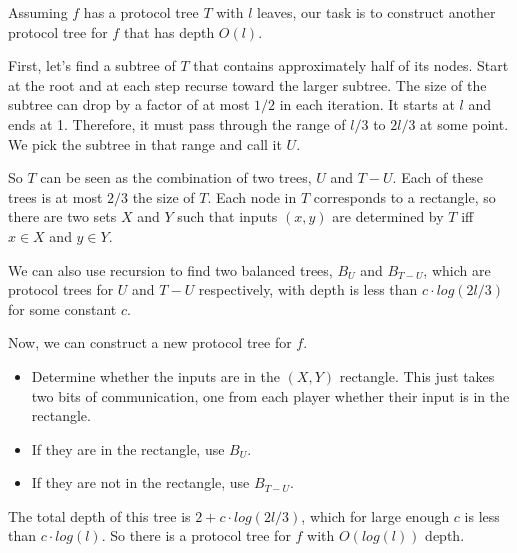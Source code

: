 \documentclass{article}
\newenvironment{problem}[2][Problem]{\begin{trivlist}
\item[\hskip \labelsep {\bfseries #1}\hskip \labelsep {\bfseries #2.}]}{\end{trivlist}}
\begin{document}
\begin{problem}{3}
  Assuming $f$ has a protocol tree $T$ with $l$ leaves, our task is to
  construct another protocol tree for $f$ that has depth $O(l)$.

  First, let's find a subtree of $T$ that contains approximately half
  of its nodes. Start at the root and at each step recurse toward the
  larger subtree. The size of the subtree can drop by a factor of at
  most $1/2$ in each iteration. It starts at $l$ and ends at
  1. Therefore, it must pass through the range of $l/3$ to $2l/3$ at
  some point. We pick the subtree in that range and call it $U$.

  So $T$ can be seen as the combination of two trees, $U$ and
  $T - U$. Each of these trees is at most $2/3$ the size of $T$. Each
  node in $T$ corresponds to a rectangle, so there are two sets $X$
  and $Y$ such that inputs $(x, y)$ are determined by $T$ iff
  $x \in X$ and $y \in Y$.

  We can also use recursion to find two balanced trees, $B_U$ and
  $B_{T-U}$, which are protocol trees for $U$ and $T-U$ respectively,
  with depth is less than $c \cdot log(2l/3)$ for some constant $c$.

  Now, we can construct a new protocol tree for $f$.

  \begin{itemize}
    \item Determine whether the
      inputs are in the $(X, Y)$ rectangle. This just takes two bits
      of communication, one from each player whether their input is in
      the rectangle.
    \item If they are in the rectangle, use $B_U$.
    \item If they are not in the rectangle, use $B_{T-U}$.
  \end{itemize}

  The total depth of this tree is $2 + c \cdot log(2l/3)$, which for large
  enough $c$ is less than $c \cdot log(l)$. So there is a protocol tree for
  $f$ with $O(log(l))$ depth.
\end{problem}
\end{document}
